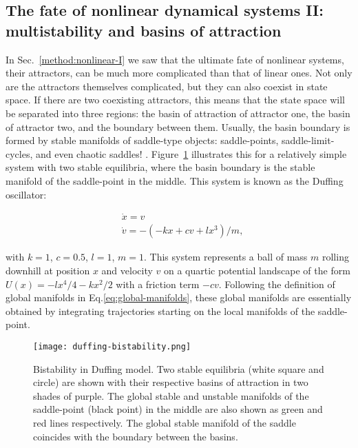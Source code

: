 \subsection{The fate of nonlinear dynamical systems II: multistability and basins of attraction}
In Sec.~\ref{method:nonlinear-I} we saw that the ultimate fate of nonlinear systems, their attractors, can be much more complicated than that of linear ones. Not only are the attractors themselves complicated, but they can also coexist in state space. If there are two coexisting attractors, this means that the state space will be separated into three regions: the basin of attraction of attractor one, the basin of attractor two, and the boundary between them. Usually, the basin boundary is formed by stable manifolds of saddle-type objects: saddle-points, saddle-limit-cycles, and even chaotic saddles! \cite{pisarchik}. Figure~\ref{fig:bistability-duffing} illustrates this for a relatively simple system with two stable equilibria, where the basin boundary is the stable manifold of the saddle-point in the middle. This system is known as the Duffing oscillator: 

\begin{align}
    &\dot{x} = v\\
    &\dot{v} = -(-kx + cv + lx^3)/m,
\end{align}

with $k = 1$, $c=0.5$, $l=1$, $m=1$. This system represents a ball of mass $m$ rolling downhill at position $x$ and velocity $v$ on a quartic potential landscape of the form $U(x) = -lx^4/4 - kx^2/2$ with a friction term $-cv$. Following the definition of global manifolds in Eq.\ref{eq:global-manifolds}, these global manifolds are essentially obtained by integrating trajectories starting on the local manifolds of the saddle-point. 
%
\begin{figure}[htb!]
    \centering 
    \texttt{[image: duffing-bistability.png]}
    \caption{Bistability in Duffing model. Two stable equilibria (white square and circle) are shown with their respective basins of attraction in two shades of purple. The global stable and unstable manifolds of the saddle-point (black point) in the middle are also shown as green and red lines respectively. The global stable manifold of the saddle coincides with the boundary between the basins.}
    \label{fig:bistability-duffing}
\end{figure}


